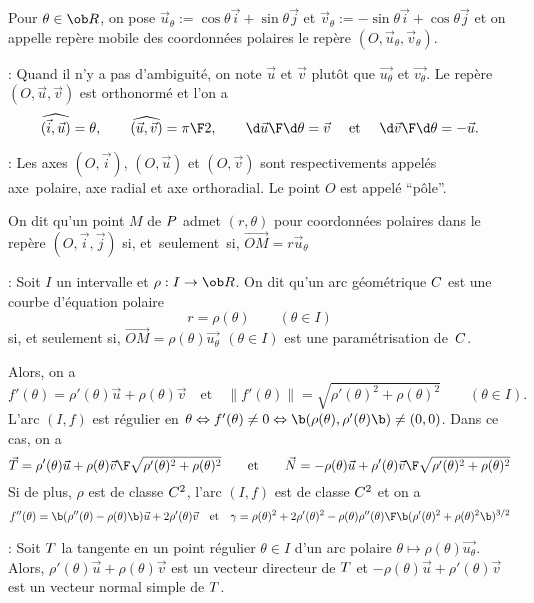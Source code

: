 \Definition Pour $\theta\in\ob R$, on pose $\vec u_\theta:=\cos\theta\vec i+\sin\theta\vec j$ et 
$\vec v_\theta:=-\sin\theta\vec i+\cos\theta\vec j$ et on appelle rep\`ere mobile 
des coordonn\'ees polaires le rep\`ere $(O, \vec u_\theta,\vec v_\theta)$. 
\bigskip

\Remarque : Quand il n'y a pas d'ambiguit\'e, on note $\vec u$ et $\vec v$ plut\^ot 
que $\vec{u_\theta}$ et $\vec{v _\theta}$. \pn
Le rep\`ere $(O,\vec u,\vec v)$ est orthonorm\'e et l'on a 
$$
\widehat{(\vec i,\vec u)}=\theta,\qquad \widehat{(\vec u,\vec v)}={\pi\F2}, \qquad {\d \vec u\F\d\theta}=\vec v
\quad\mbox{ et }
\quad{\d \vec v\F\d\theta}=-\vec u. 
$$

\Remarque : Les axes $(O,\vec i)$, $(O,\vec u)$ et $(O,\vec v)$ sont respectivements 
appel\'es axe~polaire, axe radial et axe orthoradial. 
Le point $O$ est appel\'e ``p\^ole''. 
\bigskip

\Definition On dit qu'un point $M$ de $\sc P$ 
admet $(r,\theta)$ pour coordonn\'ees polaires dans le rep\`ere $(O, \vec i,\vec j)$ si, 
et~seulement~si, $\vec {OM}=r\vec u_{\theta}$
\bigskip

\Remarque : Soit $I$ un intervalle et $\rho:I\to\ob R$. 
On dit qu'un arc g\'eom\'etrique $\sc C$ est une courbe d'\'equation polaire 
$$
r=\rho(\theta)\qquad(\theta\in I)
$$
si, et seulement si, $\vec{OM}=\rho(\theta)\vec{u_\theta}\ \,(\theta\in I)$ 
est une param\'etrisation de~$\sc C$. 
\bigskip

Alors, on a 
$$
f'(\theta)=\rho'(\theta)\vec u+\rho(\theta)\vec v \quad\mbox{et}\quad \|f'(\theta)\|=\sqrt{\rho'(\theta)^2+\rho(\theta)^2}
\qquad(\theta\in I).
$$ 
L'arc $(I,f)$ est r\'egulier en 
$\theta \Leftrightarrow f'(\theta)\neq 0 \Leftrightarrow \b(\rho(\theta),\rho'(\theta)\b)
\neq (0,0)$. Dans ce cas, on a 
$$
\vec T={\rho'(\theta)\vec u+\rho(\theta)\vec v\F\sqrt{\rho'(\theta)^2+\rho(\theta)^2}}
\qquad\mbox{et}\qquad \vec N={-\rho(\theta)\vec u+\rho'(\theta)\vec v\F\sqrt{\rho'(\theta)^2+\rho(\theta)^2}}
$$ 
Si de plus, $\rho$ est de classe $\sc C^2$, l'arc $(I,f)$ est de classe $\sc C^2$ et on a 
$$
f''(\theta)=\b(\rho''(\theta)-\rho(\theta)\b)\vec u+2\rho'(\theta)\vec v \quad\mbox{et}\quad 
\gamma={\rho(\theta)^2+2\rho'(\theta)^2-\rho(\theta)\rho''(\theta)\F\b(\rho'(\theta)^2+\rho(\theta)^2\b)^{3/2}}
$$

\Remarque : Soit $\sc T$ la tangente en un point r\'egulier $\theta\in I$ 
d'un arc polaire $\theta\mapsto\rho(\theta)\vec{u_{\theta}}$. Alors, 
$\rho'(\theta)\vec u+\rho(\theta)\vec v$ est un vecteur directeur de $\sc T$ et 
$-\rho(\theta)\vec u+\rho'(\theta)\vec v$ est un vecteur normal simple de $\sc T$. 
\bigskip

